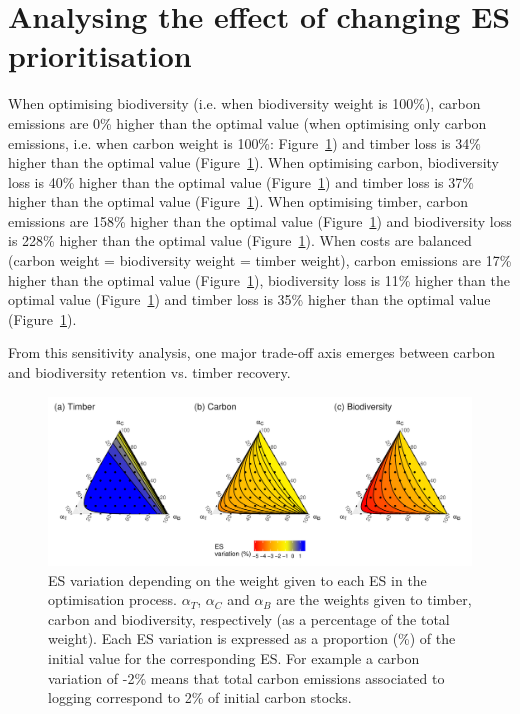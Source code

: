 \documentclass{article}
\begin{document}
\section{Analysing the effect of changing ES prioritisation}
\label{supsec:changeCost}

When optimising biodiversity (i.e. when biodiversity weight is 100\%), carbon emissions are 0\% higher than the optimal value (when optimising only carbon emissions, i.e. when carbon weight is 100\%: Figure~\ref{fig:changeCosts}) and timber loss is 34\% higher than the optimal value (Figure~\ref{fig:changeCosts}). When optimising carbon, biodiversity loss is 40\% higher than the optimal value (Figure~\ref{fig:changeCosts}) and timber loss is 37\% higher than the optimal value (Figure~\ref{fig:changeCosts}). When optimising timber, carbon emissions are 158\% higher than the optimal value (Figure~\ref{fig:changeCosts}) and biodiversity loss is 228\% higher than the optimal value (Figure~\ref{fig:changeCosts}).  When costs are balanced (carbon weight = biodiversity weight = timber weight), carbon emissions are 17\% higher than the optimal value (Figure~\ref{fig:changeCosts}), biodiversity loss is 11\% higher than the optimal value (Figure~\ref{fig:changeCosts}) and timber loss is 35\% higher than the optimal value (Figure~\ref{fig:changeCosts}). 

From this sensitivity analysis, one major trade-off axis emerges between carbon and biodiversity retention vs. timber recovery. 

\begin{figure}
    \centering
    \includegraphics[width=\textwidth]{graphs/changingESweights.pdf}
    \caption{ES variation depending on the weight given to each ES in the optimisation process. $\alpha_T$, $\alpha_C$ and $\alpha_B$ are the weights given to timber, carbon and biodiversity, respectively (as a percentage of the total weight). Each ES variation is expressed as a proportion (\%) of the initial value for the corresponding ES. For example a carbon variation of -2\% means that total carbon emissions associated to logging correspond to 2\% of initial carbon stocks.} 
    \label{fig:changeCosts}
\end{figure}
\end{document}
